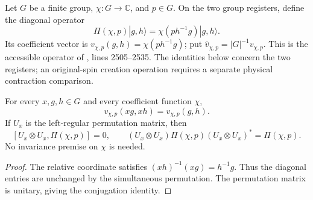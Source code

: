 \begin{definition}
    \label{def:peps_regular_charge_pair}
    \leanok
    Let $G$ be a finite group, $\chi:G\to\mathbb C$, and $p\in G$.
    On the two group registers, define the diagonal operator
    \[
        \Pi(\chi,p)|g,h\rangle=\chi(ph^{-1}g)|g,h\rangle.
    \]
    Its coefficient vector is $v_{\chi,p}(g,h)=\chi(ph^{-1}g)$;
    put $\widehat v_{\chi,p}=|G|^{-1}v_{\chi,p}$.
    This is the accessible operator of
    \cite[charge-pair creation]{Schuch2010PEPS}, lines 2505--2535.
    The identities below concern the two registers; an original-spin
    creation operation requires a separate physical contraction comparison.
\end{definition}

\begin{lemma}
    \label{thm:peps_regular_charge_pair_invariance}
    \leanok
    For every $x,g,h\in G$ and every coefficient function $\chi$,
    \[
        v_{\chi,p}(xg,xh)=v_{\chi,p}(g,h).
    \]
    If $U_x$ is the left-regular permutation matrix, then
    \[
        [U_x\otimes U_x,\Pi(\chi,p)]=0,
        \qquad
        (U_x\otimes U_x)\Pi(\chi,p)(U_x\otimes U_x)^*
        =\Pi(\chi,p).
    \]
    No invariance premise on $\chi$ is needed.
\end{lemma}
\begin{proof}\leanok
    The relative coordinate satisfies $(xh)^{-1}(xg)=h^{-1}g$.
    Thus the diagonal entries are unchanged by the simultaneous permutation.
    The permutation matrix is unitary, giving the conjugation identity.
\end{proof}

